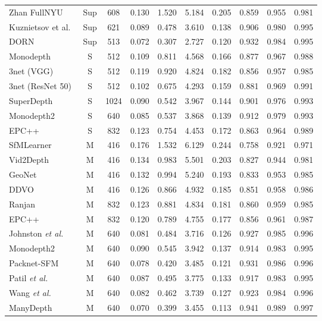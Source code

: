 \documentclass[runningheads]{llncs}
\newcommand{\etal}{\textit{et al.}}
\begin{document}
\begin{center}
\begin{table*}[t]
{\begin{tabular}{|l|c|c||a|c|c|c|c|c|c|}
\hline
Zhan FullNYU \cite{zhanst2018} & Sup  &608 & 0.130 & 1.520 & 5.184 & 0.205 & 0.859 & 0.955 & 0.981\\ 
Kuznietsov et al.~\cite{kuznietsov2017semi} &Sup &621 &0.089 &0.478 &3.610 &0.138 &0.906 &0.980 &0.995\\
DORN~\cite{dorn} &Sup &513 &0.072 &0.307 &2.727 &0.120 &0.932 &0.984 &0.995\\
\hline
Monodepth \cite{monodepth} & S &512 & 0.109 & 0.811 & 4.568 & 0.166 & 0.877 & 0.967 & 0.988\\
3net \cite{poggi20183net} (VGG) & S  &512 &   0.119 &   0.920 &   4.824 &   0.182 &   0.856 &   0.957 &   0.985 \\ 
3net \cite{poggi20183net} (ResNet 50) & S  &512 &   0.102 &   0.675 &   4.293 &   0.159 &   0.881 &   0.969 &0.991 \\ 
SuperDepth \cite{pillai2018superdepth} & S &1024 &0.090 &0.542 &3.967 &0.144 &0.901 &0.976 &0.993 \\
Monodepth2~\cite{monodepth2} & S &640 &0.085  &0.537  &3.868  &0.139  &0.912  &0.979  &0.993  \\
EPC++ \cite{luo2019every} & S & 832 & 0.123 & 0.754 & 4.453 & 0.172 & 0.863 & 0.964 &0.989\\

\hline
SfMLearner \cite{zhou2017unsupervised} & M &416 & 0.176 & 1.532 & 6.129 & 0.244 & 0.758 & 0.921 & 0.971\\
Vid2Depth \cite{mahjourian2018unsupervised} & M &416 & 0.134 & 0.983 & 5.501 & 0.203 & 0.827 & 0.944 & 0.981\\
GeoNet \cite{geonet2018} & M  &416 & 0.132 & 0.994 & 5.240 & 0.193 & 0.833 & 0.953 & 0.985\\
DDVO \cite{wang2017learning} & M  &416 & 0.126 & 0.866 & 4.932 & 0.185 & 0.851 & 0.958 & 0.986\\ 
Ranjan \cite{ranjan2018adversarial}  & M & 832  &0.123 & 0.881 & 4.834 & 0.181 & 0.860 & 0.959 & 0.985\\
EPC++ \cite{luo2019every} & M  & 832 &0.120 & 0.789 &  4.755  & 0.177  & 0.856 &  0.961 &  0.987\\
Johnston \etal~\cite{johnston2020self} & M & 640 &0.081 & 0.484  & 3.716  & 0.126  & 0.927  & 0.985  & 0.996 \\
Monodepth2 \cite{monodepth2} & M  &  640 &0.090 & 0.545 & 3.942 & 0.137 & 0.914 & 0.983 & 0.995\\ 
Packnet-SFM \cite{packnet} & M & 640 &0.078 & 0.420 &  3.485 &  0.121 &  0.931 &  0.986 &  0.996\\
Patil \etal \cite{patil2020dont}  & M  & 640&   0.087  &   0.495  &   3.775  &   0.133  &   0.917  &   0.983  &   0.995  \\
Wang \etal \cite{wang2020self} & M    & 640  &0.082 & 0.462 & 3.739 & 0.127 &  0.923 &  0.984 & 0.996\\
ManyDepth~\cite{manydepth} & M  & 640 &0.070  &0.399  &3.455  &0.113  &0.941  &0.989  &0.997\\


\end{tabular}}
\end{table*}
\end{center}
\end{document}
